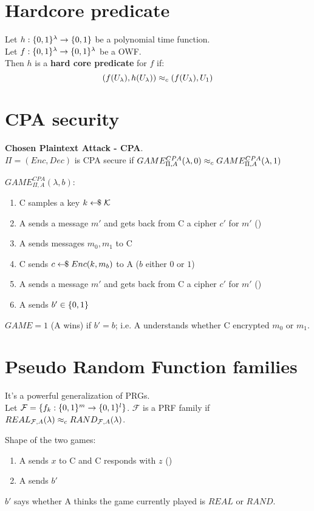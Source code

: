 \section{Hardcore predicate}
Let $h : \{0,1\}^\lambda \rightarrow \{0,1\}$ be a polynomial time function.\\
Let $f : \{0,1\}^\lambda \rightarrow \{0,1\}^\lambda$ be a OWF.\\
Then $h$ is a \textbf{hard core predicate} for $f$ if:
\[ (f(U_\lambda), h(U_\lambda)) \approx_c (f(U_\lambda), U_1) \]


\section{CPA security}
\textbf{Chosen Plaintext Attack - CPA}.\\
$\Pi = (Enc,Dec)$ is CPA secure if $GAME_{\Pi , A}^{CPA}(\lambda,0) \approx_c GAME_{\Pi , A}^{CPA}(\lambda,1)$

$GAME_{\Pi , A}^{CPA}(\lambda,b)$:
\begin{enumerate}
    \item C samples a key $k \leftarrow\kern-0.42em{\$} \; \mathcal{K}$
    \item A sends a message $m'$ and gets back from C a cipher $c'$ for $m'$ (\poly)
    \item A sends messages $m_0,m_1$ to C
    \item C sends $c \leftarrow\kern-0.42em{\$} \; Enc(k,m_b)$ to A ($b$ either $0$ or $1$)
    \item A sends a message $m'$ and gets back from C a cipher $c'$ for $m'$ (\poly)
    \item A sends $b' \in \{0,1\}$
\end{enumerate}
$GAME = 1$ (A wins) if $b' = b$; i.e. A understands whether C encrypted $m_0$ or $m_1$.


\section{Pseudo Random Function families}
It's a powerful generalization of PRGs.\\
Let $\mathcal{F} = \{ f_k : \{0,1\}^m \rightarrow \{0,1\}^l \}$. $\mathcal{F}$ is a PRF family if $REAL_{\mathcal{F},A}(\lambda) \approx_c RAND_{\mathcal{F},A}(\lambda)$.

Shape of the two games:
\begin{enumerate}
    \item A sends $x$ to C and C responds with $z$ (\poly)
    \item A sends $b'$
\end{enumerate}
$b'$ says whether A thinks the game currently played is $REAL$ or $RAND$.

